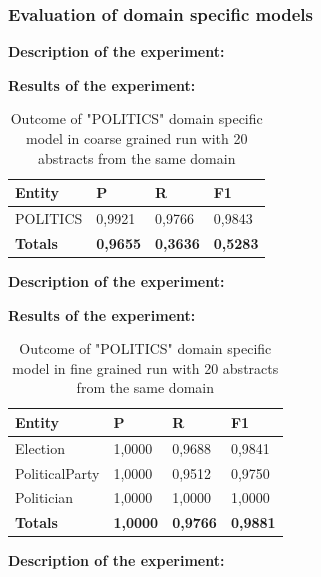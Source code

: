 \documentclass[thesis=M,english]{FITthesis}[2018/05/30]
\begin{document}
\subsubsection{Evaluation of domain specific models}
\textbf{Description of the experiment:}

\textbf{Results of the experiment:}
	
	\begin{table}[H]\centering
		\begin{tabular}{|l|l|l|l|}
			\hline {\textbf{Entity}} & {\textbf{P}} & {\textbf{R}} & {\textbf{F1}}\\\hline
				POLITICS & 0,9921 & 0,9766 & 0,9843\\\hline
				\textbf{Totals} & \textbf{0,9655} & \textbf{0,3636} & \textbf{0,5283}\\\hline
		\end{tabular}
		\caption{Outcome of "POLITICS" domain specific model in coarse grained run with 20 abstracts from the same domain \label{table:PoliticsDomainWithPoliticsTop20Coarse}}		
	\end{table}	
	
\textbf{Description of the experiment:}

\textbf{Results of the experiment:}
	
	\begin{table}[H]\centering
		\begin{tabular}{|l|l|l|l|}
			\hline {\textbf{Entity}} & {\textbf{P}} & {\textbf{R}} & {\textbf{F1}}\\\hline
				Election & 1,0000 & 0,9688 & 0,9841\\
				PoliticalParty & 1,0000 & 0,9512 & 0,9750\\
				Politician & 1,0000 & 1,0000 & 1,0000\\\hline
				\textbf{Totals} & \textbf{1,0000} & \textbf{0,9766} & \textbf{0,9881}\\\hline
		\end{tabular}
		\caption{Outcome of "POLITICS" domain specific model in fine grained run with 20 abstracts from the same domain \label{table:PoliticsDomainWithPoliticsTop20Fine}}	
	\end{table}
	
\textbf{Description of the experiment:}
\end{document}
